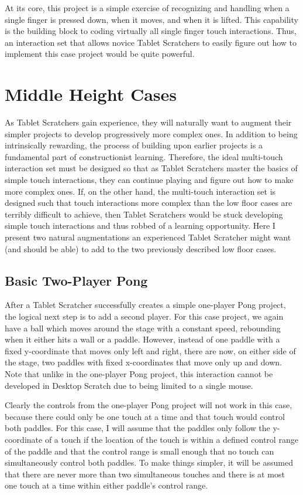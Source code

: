 At its core, this project is a simple exercise of recognizing and handling when a single finger is pressed down, when it moves, and when it is lifted. This capability is the building block to coding virtually all single finger touch interactions. Thus, an interaction set that allows novice Tablet Scratchers to easily figure out how to implement this case project would be quite powerful.

\section{Middle Height Cases}
As Tablet Scratchers gain experience, they will naturally want to augment their simpler projects to develop progressively more complex ones. In addition to being intrinsically rewarding, the process of building upon earlier projects is a fundamental part of constructionist learning. Therefore, the ideal multi-touch interaction set must be designed so that as Tablet Scratchers master the basics of simple touch interactions, they can continue playing and figure out how to make more complex ones. If, on the other hand, the multi-touch interaction set is designed such that touch interactions more complex than the low floor cases are terribly difficult to achieve, then Tablet Scratchers would be stuck developing simple touch interactions and thus robbed of a learning opportunity. Here I present two natural augmentations an experienced Tablet Scratcher might want (and should be able) to add to the two previously described low floor cases. 

\subsection{Basic Two-Player Pong}
After a Tablet Scratcher successfully creates a simple one-player Pong project, the logical next step is to add a second player. For this case project, we again have a ball which moves around the stage with a constant speed, rebounding when it either hits a wall or a paddle. However, instead of one paddle with a fixed y-coordinate that moves only left and right, there are now, on either side of the stage, two paddles with fixed x-coordinates that move only up and down. Note that unlike in the one-player Pong project, this interaction cannot be developed in Desktop Scratch due to being limited to a single mouse.

Clearly the controls from the one-player Pong project will not work in this case, because there could only be one touch at a time and that touch would control both paddles. For this case, I will assume that the paddles only follow the y-coordinate of a touch if the location of the touch is within a defined control range of the paddle and that the control range is small enough that no touch can simultaneously control both paddles. To make things simpler, it will be assumed that there are never more than two simultaneous touches and there is at most one touch at a time within either paddle's control range. 

